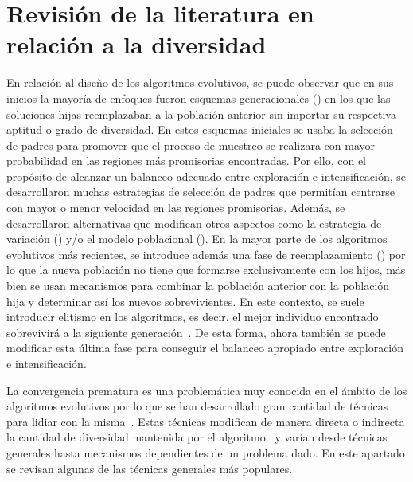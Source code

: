 \section{Revisión de la literatura en relación a la diversidad}

En relación al diseño de los algoritmos evolutivos, se puede observar que en sus inicios la mayoría de enfoques fueron esquemas generacionales (\cite{de2006evolutionary}) en los 
que las soluciones hijas reemplazaban a la población anterior sin importar su respectiva aptitud o grado de diversidad.
%
En estos esquemas iniciales se usaba la selección de padres para promover que el proceso de muestreo se realizara con mayor probabilidad en las regiones más promisorias encontradas. 
%
Por ello, con el propósito de alcanzar un balanceo adecuado entre exploración e intensificación, se desarrollaron muchas estrategias de selección de padres que permitían centrarse con mayor o menor velocidad en las regiones promisorias.
%
Además, se desarrollaron alternativas que modifican otros aspectos como la estrategia de variación (\cite{Joel:herrera2003fuzzy}) y/o 
el modelo poblacional (\cite{alba2005parallel}).
%
En la mayor parte de los algoritmos evolutivos más recientes, se introduce además una fase de reemplazamiento (\cite{eiben2003introduction}) por lo que
la nueva población no tiene que formarse exclusivamente con los hijos, más bien se usan mecanismos para combinar la población anterior con la población hija y determinar así los nuevos sobrevivientes.
%
En este contexto, se suele introducir elitismo en los algoritmos, es decir, el mejor individuo encontrado sobrevivirá a la siguiente generación~\cite{Joel:CHC}.
%
De esta forma, ahora también se puede modificar esta última fase para conseguir el balanceo apropiado entre exploración e intensificación.

La convergencia prematura es una problemática muy conocida en el ámbito de los algoritmos evolutivos por lo que se han desarrollado gran cantidad de técnicas 
para lidiar con la misma~\cite{pandey2014comparative}.
%
Estas técnicas modifican de manera directa o indirecta la cantidad de diversidad mantenida por el algoritmo~\cite{Joel:Crepinsek}
y varían desde técnicas generales hasta mecanismos dependientes de un problema dado.
%
En este apartado se revisan algunas de las técnicas generales más populares.

%
%
%

